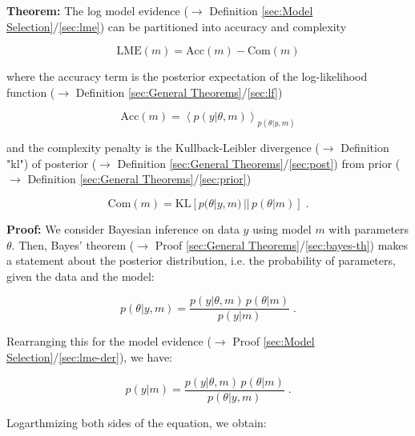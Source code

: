 \documentclass[a4paper,12pt]{book}
\begin{document}
\vspace{1em}
\textbf{Theorem:} The log model evidence ($\rightarrow$ Definition \ref{sec:Model Selection}/\ref{sec:lme}) can be partitioned into accuracy and complexity

\begin{equation} \label{eq:lme-anc-LME}
\mathrm{LME}(m) = \mathrm{Acc}(m) - \mathrm{Com}(m)
\end{equation}

where the accuracy term is the posterior expectation of the log-likelihood function ($\rightarrow$ Definition \ref{sec:General Theorems}/\ref{sec:lf})

\begin{equation} \label{eq:lme-anc-Acc}
\mathrm{Acc}(m) = \left\langle p(y|\theta,m) \right\rangle_{p(\theta|y,m)}
\end{equation}

and the complexity penalty is the Kullback-Leibler divergence ($\rightarrow$ Definition "kl") of posterior ($\rightarrow$ Definition \ref{sec:General Theorems}/\ref{sec:post}) from prior ($\rightarrow$ Definition \ref{sec:General Theorems}/\ref{sec:prior})

\begin{equation} \label{eq:lme-anc-Com}
\mathrm{Com}(m) = \mathrm{KL} \left[ p(\theta|y,m) \, || \, p(\theta|m) \right] \; .
\end{equation}


\vspace{1em}
\textbf{Proof:} We consider Bayesian inference on data $y$ using model $m$ with parameters $\theta$. Then, Bayes' theorem ($\rightarrow$ Proof \ref{sec:General Theorems}/\ref{sec:bayes-th}) makes a statement about the posterior distribution, i.e. the probability of parameters, given the data and the model:

\begin{equation} \label{eq:lme-anc-AnC-s1}
p(\theta|y,m) = \frac{p(y|\theta,m) \, p(\theta|m)}{p(y|m)} \; .
\end{equation}

Rearranging this for the model evidence ($\rightarrow$ Proof \ref{sec:Model Selection}/\ref{sec:lme-der}), we have:

\begin{equation} \label{eq:lme-anc-AnC-s2}
p(y|m) = \frac{p(y|\theta,m) \, p(\theta|m)}{p(\theta|y,m)} \; .
\end{equation}

Logarthmizing both sides of the equation, we obtain:
\end{document}
